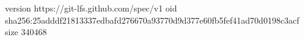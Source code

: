 version https://git-lfs.github.com/spec/v1
oid sha256:25adddf21813337edbafd276670a93770d9d377e60fb5fef41ad70d0198c3acf
size 340468
